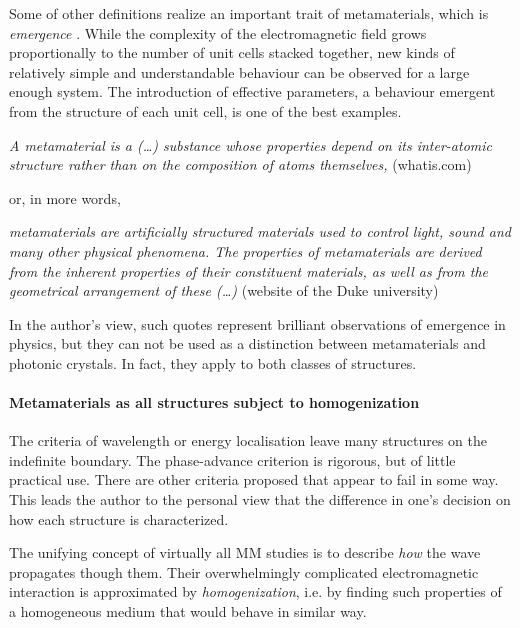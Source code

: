 Some of other definitions realize an important trait of metamaterials, which is \textit{emergence} \cite{sihvola2002electromagnetic}. While the complexity of the electromagnetic field grows proportionally to the number of unit cells stacked together, new kinds of relatively simple and understandable behaviour can be observed for a large enough system. The introduction of effective parameters, a behaviour emergent from the structure of each unit cell, is one of the best examples.
\begin{displayquote}
\textit{A metamaterial is a (\ldots) substance whose properties depend on its inter-atomic structure rather than on the composition of atoms themselves,}  (whatis.com)
\end{displayquote}
or, in more words,
\begin{displayquote}
\textit{metamaterials are artificially structured materials used to control light, sound and many other physical phenomena. The properties of metamaterials are derived from the inherent properties of their constituent materials, as well as from the geometrical arrangement of these (\ldots)}  (website of the Duke university) %
\end{displayquote}
In the author's view, such quotes represent brilliant observations of emergence in physics, but they can not be used as a distinction between metamaterials and photonic crystals. In fact, they apply to both classes of structures.

\paragraph{Metamaterials as all structures subject to homogenization} %
The criteria of wavelength or energy localisation leave many structures on the indefinite boundary. The phase-advance criterion is rigorous, but of little practical use. There are other criteria proposed that appear to fail in some way. This leads the author to the personal view that the difference in one's decision on how each structure is characterized. 

The unifying concept of virtually all MM studies is to describe \textit{how} the wave propagates though them. Their overwhelmingly complicated electromagnetic interaction is approximated by \textit{homogenization}, i.e. by finding such properties of a homogeneous medium that would behave in similar way.

